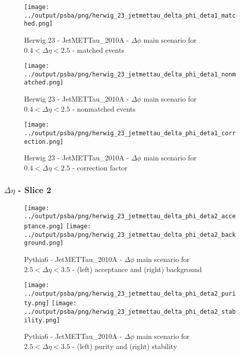 \documentclass[11pt]{book}
\begin{document}
\begin{figure}[ht]
\centering
\texttt{[image: ../output/psba/png/herwig\_23\_jetmettau\_delta\_phi\_deta1\_matched.png]}
\caption{Herwig 23 - JetMETTau\_2010A - $\Delta\phi$ main scenario for $0.4 < \Delta\eta < 2.5$ - matched events}
\label{fig:hw_23_jetmettau_delta_phi_deta1_matched}
\end{figure}

\begin{figure}[ht]
\centering
\texttt{[image: ../output/psba/png/herwig\_23\_jetmettau\_delta\_phi\_deta1\_nonmatched.png]}
\caption{Herwig 23 - JetMETTau\_2010A - $\Delta\phi$ main scenario for $0.4 < \Delta\eta < 2.5$ - nonmatched events}
\label{fig:hw_23_jetmettau_delta_phi_deta1_nonmatched}
\end{figure}

\begin{figure}[ht]
\centering
\texttt{[image: ../output/psba/png/herwig\_23\_jetmettau\_delta\_phi\_deta1\_correction.png]}
\caption{Herwig 23 - JetMETTau\_2010A - $\Delta\phi$ main scenario for $0.4 < \Delta\eta < 2.5$ - correction factor}
\label{fig:hw_23_jetmettau_delta_phi_deta1_correction}
\end{figure}

\clearpage
\subsubsection{$\Delta\eta$ - Slice 2}

\begin{figure}[ht]
\centering
\texttt{[image: ../output/psba/png/herwig\_23\_jetmettau\_delta\_phi\_deta2\_acceptance.png]}
\texttt{[image: ../output/psba/png/herwig\_23\_jetmettau\_delta\_phi\_deta2\_background.png]}
\caption{Pythia6 - JetMETTau\_2010A - $\Delta\phi$ main scenario for $2.5 < \Delta\eta < 3.5$ - (left) acceptance and (right) background}
\label{fig:p6_jetmettau_delta_phi_deta2_ab}
\end{figure}

\begin{figure}[ht]
\centering
\texttt{[image: ../output/psba/png/herwig\_23\_jetmettau\_delta\_phi\_deta2\_purity.png]}
\texttt{[image: ../output/psba/png/herwig\_23\_jetmettau\_delta\_phi\_deta2\_stability.png]}
\caption{Pythia6 - JetMETTau\_2010A - $\Delta\phi$ main scenario for $2.5 < \Delta\eta < 3.5$ - (left) purity and (right) stability}
\label{fig:p6_jetmettau_delta_phi_deta2_ps}
\end{figure}
\end{document}
